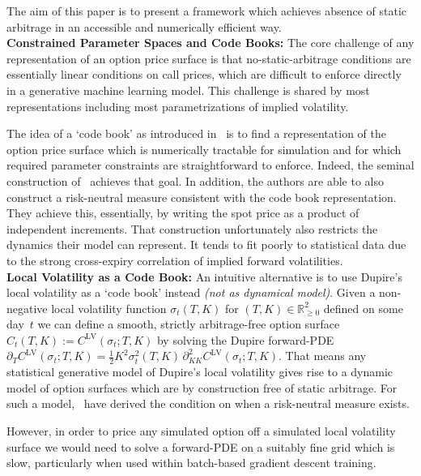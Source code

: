 \documentclass[11pt,a4paper]{article}
\newcommand{\R}{\mathbb{R}}
\begin{document}
The aim of this paper is to present a framework which achieves absence of static arbitrage
in an accessible and numerically efficient way.\\




\noindent
\textbf{Constrained Parameter Spaces and Code Books:}
The core challenge of any representation of an option price surface is that no-static-arbitrage conditions are essentially
linear conditions on call prices, which are difficult to enforce directly in a generative machine learning model. 
This challenge is shared by most representations including most parametrizations of implied volatility.

The idea of a `code book' as introduced in~\citet{TangentLevy} is to find a representation of the option price surface
which is numerically tractable for simulation and for which required parameter constraints are straightforward to enforce.
Indeed, the seminal construction of~\citet{TangentLevy} achieves that goal. In addition, the authors are able to also
construct a risk-neutral measure consistent with the code book representation.
They achieve this, essentially, by writing the spot price as a product of independent increments. That construction unfortunately also restricts
the dynamics their model can represent. It tends to fit poorly to statistical data due to the strong cross-expiry correlation of implied forward volatilities.
\\

\noindent
\textbf{Local Volatility as a Code Book:}
An intuitive alternative is to use Dupire's local volatility as a `code book' instead
\emph{(not as dynamical model)}. Given a non-negative local volatility function
$\sigma_t(T,K)$ for $(T,K)\in\R^2_{\geq 0}$ defined on some day~$t$
we can define 
a smooth, strictly arbitrage-free option surface 
$C_t(T,K):=C^\mathrm{LV}(\sigma_t;T,K)$ 
by solving the Dupire forward-PDE
$\partial_T C^\mathrm{LV}(\sigma_t;T,K)
 = \mbox{$\frac12$}K^2\sigma_t^2(T,K)\,
   \partial^2_{KK}C^\mathrm{LV}(\sigma_t;T,K)$.
That means any statistical generative model of Dupire's local volatility gives rise
to a dynamic model of option surfaces which are by construction free of static arbitrage.
For such a model,~\cite{CarmonaNadtochiy2009} have derived the condition on when a risk-neutral measure exists.

However, in order to price any simulated option off a simulated local volatility surface
we would need to solve a forward-PDE on a suitably
fine grid which is slow, particularly when used within batch-based gradient descent training.
\end{document}
